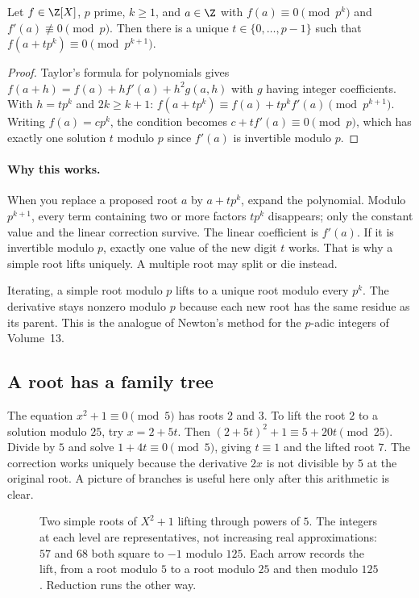 \begin{theorem}\label{thm:hensel}
Let $f\in\Z[X]$, $p$ prime, $k\ge1$, and $a\in\Z$ with $f(a)\equiv0\pmod{p^k}$ and $f'(a)\not\equiv0\pmod p$. Then there is a unique $t\in\{0,\dots,p-1\}$ such that $f(a+tp^k)\equiv0\pmod{p^{k+1}}$.
\end{theorem}
\begin{proof}
Taylor's formula for polynomials gives $f(a+h)=f(a)+hf'(a)+h^2g(a,h)$ with $g$ having integer coefficients. With $h=tp^k$ and $2k\ge k+1$:
$f(a+tp^k)\equiv f(a)+tp^kf'(a)\pmod{p^{k+1}}$. Writing $f(a)=cp^k$, the condition becomes $c+tf'(a)\equiv0\pmod p$, which has exactly one solution $t$ modulo $p$ since $f'(a)$ is invertible modulo $p$.
\end{proof}

\paragraph{Why this works.}
When you replace a proposed root $a$ by $a+tp^k$, expand the polynomial. Modulo $p^{k+1}$, every term containing two or more factors $tp^k$ disappears; only the constant value and the linear correction survive. The linear coefficient is $f'(a)$. If it is invertible modulo $p$, exactly one value of the new digit $t$ works. That is why a simple root lifts uniquely. A multiple root may split or die instead.

Iterating, a simple root modulo $p$ lifts to a unique root modulo every $p^k$. The derivative stays nonzero modulo $p$ because each new root has the same residue as its parent. This is the analogue of Newton's method for the $p$-adic integers of Volume~13.

\subsection*{A root has a family tree}
The equation $x^2+1\equiv0\pmod5$ has roots $2$ and $3$. To lift the root $2$ to a solution modulo $25$, try $x=2+5t$. Then $(2+5t)^2+1\equiv5+20t\pmod{25}$. Divide by $5$ and solve $1+4t\equiv0\pmod5$, giving $t\equiv1$ and the lifted root $7$. The correction works uniquely because the derivative $2x$ is not divisible by $5$ at the original root. A picture of branches is useful here only after this arithmetic is clear.

\begin{figure}[ht]
\centering{}
\caption{Two simple roots of $X^2+1$ lifting through powers of $5$. The integers at each level are representatives, not increasing real approximations: $57$ and $68$ both square to $-1$ modulo $125$. Each arrow records the lift, from a root modulo $5$ to a root modulo $25$ and then modulo $125$. Reduction runs the other way.}
\label{fig:hensel-branches}
\end{figure}

